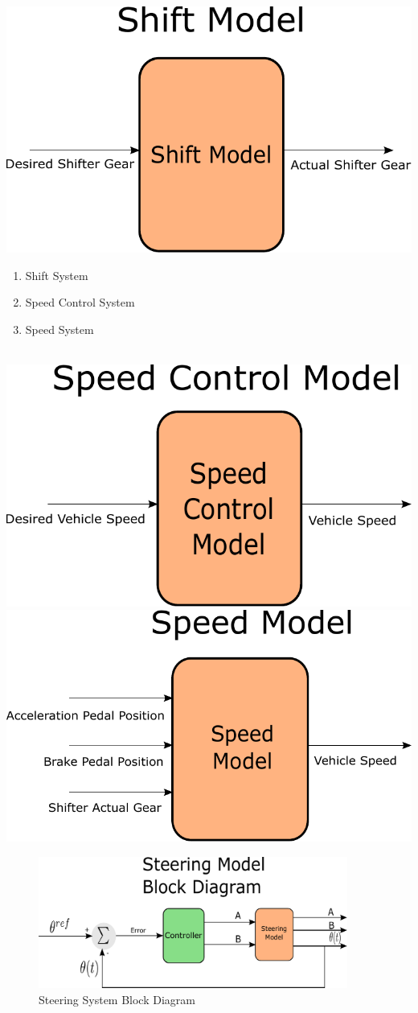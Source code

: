 \documentclass{beamer}
\begin{document}
\begin{frame}
\centering
\includegraphics[width=.45\linewidth]{figs/inkscape/shiftModelArchitecture}\quad%
\begin{minipage}[b][0.4\textheight][c]{.45\linewidth} \begin{enumerate} \item Shift System \item Speed Control System \item Speed System \end{enumerate} \end{minipage}\\[1em]
\includegraphics[width=.45\linewidth]{figs/inkscape/speedControlModelArchitecture}\quad%
\includegraphics[width=.45\linewidth]{figs/inkscape/speedModelArchitecture}
\end{frame}


\begin{frame}
\begin{figure}[h]
    \centering
    \captionsetup{justification=centering, margin=3cm}
    \includegraphics[width=4in]{figs/inkscape/steeringModelBlockDiagram}
    \caption{Steering System Block Diagram}
    \label{fig:steerBlockDiag}
\end{figure}
\end{frame}
\end{document}
